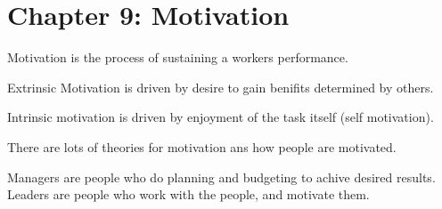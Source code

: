 \documentclass[12pt,letterpaper]{article} \usepackage{amsmath} \usepackage{graphicx} \usepackage[margin=1in]{geometry} \usepackage{longtable}  \usepackage{amssymb}
\begin{document}
		\section{Chapter 9: Motivation}
		Motivation is the process of sustaining a workers performance. 
		
		Extrinsic Motivation is driven by desire to gain benifits determined by others. 
		
		Intrinsic motivation is driven by enjoyment of the task itself (self motivation).
		
		There are lots of theories for motivation ans how people are motivated. 
		
		Managers are people who do planning and budgeting to achive desired results. Leaders are people who work with the people, and motivate them.
		
	
\end{document}

